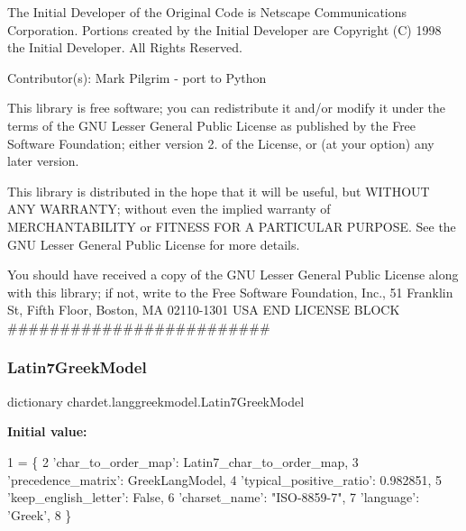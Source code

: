 The Initial Developer of the Original Code is Netscape Communications Corporation. Portions created by the Initial Developer are Copyright (C) 1998 the Initial Developer. All Rights Reserved.

Contributor(s)\+: Mark Pilgrim -\/ port to Python

This library is free software; you can redistribute it and/or modify it under the terms of the G\+NU Lesser General Public License as published by the Free Software Foundation; either version 2. of the License, or (at your option) any later version.

This library is distributed in the hope that it will be useful, but W\+I\+T\+H\+O\+UT A\+NY W\+A\+R\+R\+A\+N\+TY; without even the implied warranty of M\+E\+R\+C\+H\+A\+N\+T\+A\+B\+I\+L\+I\+TY or F\+I\+T\+N\+E\+SS F\+OR A P\+A\+R\+T\+I\+C\+U\+L\+AR P\+U\+R\+P\+O\+SE. See the G\+NU Lesser General Public License for more details.

You should have received a copy of the G\+NU Lesser General Public License along with this library; if not, write to the Free Software Foundation, Inc., 51 Franklin St, Fifth Floor, Boston, MA 02110-\/1301 U\+SA E\+ND L\+I\+C\+E\+N\+SE B\+L\+O\+CK \#\#\#\#\#\#\#\#\#\#\#\#\#\#\#\#\#\#\#\#\#\#\#\#\# \mbox{\label{namespacechardet_1_1langgreekmodel_a75e86bfe2b8e9fe96bcfbdb96850486b}} 
\subsubsection{\texorpdfstring{Latin7\+Greek\+Model}{Latin7GreekModel}}
{\footnotesize\ttfamily dictionary chardet.\+langgreekmodel.\+Latin7\+Greek\+Model}

{\bfseries Initial value\+:}
\begin{DoxyCode}
1 =  \{
2   \textcolor{stringliteral}{'char\_to\_order\_map'}: Latin7\_char\_to\_order\_map,
3   \textcolor{stringliteral}{'precedence\_matrix'}: GreekLangModel,
4   \textcolor{stringliteral}{'typical\_positive\_ratio'}: 0.982851,
5   \textcolor{stringliteral}{'keep\_english\_letter'}: \textcolor{keyword}{False},
6   \textcolor{stringliteral}{'charset\_name'}: \textcolor{stringliteral}{"ISO-8859-7"},
7   \textcolor{stringliteral}{'language'}: \textcolor{stringliteral}{'Greek'},
8 \}
\end{DoxyCode}
\mbox{\label{namespacechardet_1_1langgreekmodel_a8152d3e3cd169f83e5127973bf4635a7}} 
